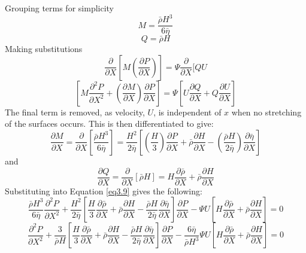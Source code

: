 Grouping terms for simplicity
\begin{equation}\label{eq3.6}
	M=\frac{\bar{\rho} H^{3}}{6 \bar{\eta}}
\end{equation}
\begin{equation}\label{eq3.7}
	Q=\bar{\rho} H
\end{equation}
Making substitutions
\begin{equation}\label{eq3.8}
	\frac{\partial}{\partial X}\left[M\left(\frac{\partial P}{\partial X}\right)\right]=\Psi \frac{\partial}{\partial X}[Q U
\end{equation}
\begin{equation}\label{eq3.9}
	\left[M \frac{\partial^{2} P}{\partial X^{2}}+\left(\frac{\partial M}{\partial X}\right) \frac{\partial P}{\partial X}\right]=\Psi\left[U \frac{\partial Q}{\partial X}+Q \frac{\partial U}{\partial X}\right]
\end{equation}
The final term is removed, as velocity, $U$, is independent of $x$ when no stretching of the surfaces occurs. This is then differentiated to give:
\begin{equation}\label{eq3.10}
	\frac{\partial M}{\partial X}=\frac{\partial}{\partial X}\left[\frac{\bar{\rho} H^{3}}{6 \bar{\eta}}\right]=\frac{H^{2}}{2 \bar{\eta}}\left[\left(\frac{H}{3}\right) \frac{\partial P}{\partial X}+\bar{\rho} \frac{\partial H}{\partial X}-\left(\frac{\bar{\rho} H}{2 \bar{\eta}}\right) \frac{\partial \bar{\eta}}{\partial X}\right]
\end{equation}
and
\begin{equation}\label{eq3.11}
	\frac{\partial Q}{\partial X}=\frac{\partial}{\partial X}[\bar{\rho} H]=H \frac{\partial \bar{\rho}}{\partial X}+\bar{\rho} \frac{\partial H}{\partial X}
\end{equation}
Substituting into Equation \ref{eq3.9} gives the following:
\begin{equation}\label{eq1.12}
	\frac{\bar{\rho} H^{3}}{6 \bar{\eta}} \frac{\partial^{2} P}{\partial X^{2}}+\frac{H^{2}}{2 \bar{\eta}}\left[\frac{H}{3} \frac{\partial \bar{\rho}}{\partial X}+\bar{\rho} \frac{\partial H}{\partial X}-\frac{\bar{\rho} H}{2 \bar{\eta}} \frac{\partial \bar{\eta}}{\partial X}\right] \frac{\partial P}{\partial X}-\Psi U\left[H \frac{\partial \bar{\rho}}{\partial X}+\bar{\rho} \frac{\partial H}{\partial X}\right]=0
\end{equation}
\begin{equation}\label{eq3.13}
	\frac{\partial^{2} P}{\partial X^{2}}+\frac{3}{\bar{\rho} H}\left[\frac{H}{3} \frac{\partial \bar{\rho}}{\partial X}+\bar{\rho} \frac{\partial H}{\partial X}-\frac{\bar{\rho} H}{2 \bar{\eta}} \frac{\partial \bar{\eta}}{\partial X}\right] \frac{\partial P}{\partial X}-\frac{6 \bar{\eta}}{\bar{\rho} H^{3}} \Psi U\left[H \frac{\partial \bar{\rho}}{\partial X}+\bar{\rho} \frac{\partial H}{\partial X}\right]=0
\end{equation}
